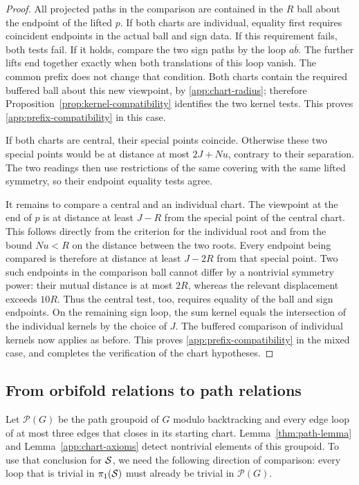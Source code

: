 \begin{proof}
All projected paths in the comparison are contained in the $R$ ball
about the endpoint of the lifted $p$.  If both charts are individual,
equality first requires coincident endpoints in the actual ball and
sign data.  If this requirement fails, both tests fail.  If it holds,
compare the two sign paths by the loop $a\overline b$.  The further
lifts end together exactly when both translations of this loop
vanish.  The common prefix does not change that condition.  Both
charts contain the required buffered ball about this new viewpoint,
by \eqref{app:chart-radius}; therefore
Proposition~\ref{prop:kernel-compatibility} identifies the two kernel
tests.  This proves \eqref{app:prefix-compatibility} in this case.

If both charts are central, their special points coincide.  Otherwise
these two special points would be at distance at most $2J+Nu$,
contrary to their separation.  The two readings then use restrictions
of the same covering with the same lifted symmetry, so their endpoint
equality tests agree.

It remains to compare a central and an individual chart.  The
viewpoint at the end of $p$ is at distance at least $J-R$ from the
special point of the central chart.  This follows directly from the
criterion for the individual root and from the bound $Nu<R$ on the
distance between the two roots.  Every endpoint being compared is
therefore at distance at least $J-2R$ from that special point.  Two
such endpoints in the comparison ball cannot differ by a nontrivial
symmetry power: their mutual distance is at most $2R$, whereas the
relevant displacement exceeds $10R$.  Thus the central test, too,
requires equality of the ball and sign endpoints.  On the remaining
sign loop, the sum kernel equals the intersection of the individual
kernels by the choice of $J$.  The buffered comparison of individual
kernels now applies as before.  This proves
\eqref{app:prefix-compatibility} in the mixed case, and completes the
verification of the chart hypotheses.
\end{proof}

\subsection{From orbifold relations to path relations}

Let $\mathcal P(G)$ be the path groupoid of $G$ modulo backtracking
and every edge loop of at most three edges that closes in its starting
chart.  Lemma~\ref{thm:path-lemma} and
Lemma~\ref{app:chart-axioms} detect nontrivial elements of this
groupoid.  To use that conclusion for $\mathcal S$, we need the following
direction of comparison: every loop that is trivial in
$\pi_1(\mathcal S)$ must already be trivial in $\mathcal P(G)$.

